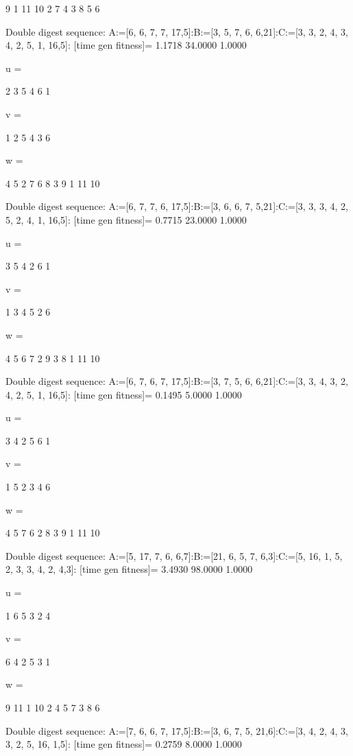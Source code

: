      9     1    11    10     2     7     4     3     8     5     6

Double digest sequence:
A:=[6, 6, 7, 7, 17,5]:B:=[3, 5, 7, 6, 6,21]:C:=[3, 3, 2, 4, 3, 4, 2, 5, 1, 16,5]:
[time gen fitness]=
    1.1718   34.0000    1.0000


u =

     2     3     5     4     6     1


v =

     1     2     5     4     3     6


w =

     4     5     2     7     6     8     3     9     1    11    10

Double digest sequence:
A:=[6, 7, 7, 6, 17,5]:B:=[3, 6, 6, 7, 5,21]:C:=[3, 3, 3, 4, 2, 5, 2, 4, 1, 16,5]:
[time gen fitness]=
    0.7715   23.0000    1.0000


u =

     3     5     4     2     6     1


v =

     1     3     4     5     2     6


w =

     4     5     6     7     2     9     3     8     1    11    10

Double digest sequence:
A:=[6, 7, 6, 7, 17,5]:B:=[3, 7, 5, 6, 6,21]:C:=[3, 3, 4, 3, 2, 4, 2, 5, 1, 16,5]:
[time gen fitness]=
    0.1495    5.0000    1.0000


u =

     3     4     2     5     6     1


v =

     1     5     2     3     4     6


w =

     4     5     7     6     2     8     3     9     1    11    10

Double digest sequence:
A:=[5, 17, 7, 6, 6,7]:B:=[21, 6, 5, 7, 6,3]:C:=[5, 16, 1, 5, 2, 3, 3, 4, 2, 4,3]:
[time gen fitness]=
    3.4930   98.0000    1.0000


u =

     1     6     5     3     2     4


v =

     6     4     2     5     3     1


w =

     9    11     1    10     2     4     5     7     3     8     6

Double digest sequence:
A:=[7, 6, 6, 7, 17,5]:B:=[3, 6, 7, 5, 21,6]:C:=[3, 4, 2, 4, 3, 3, 2, 5, 16, 1,5]:
[time gen fitness]=
    0.2759    8.0000    1.0000


